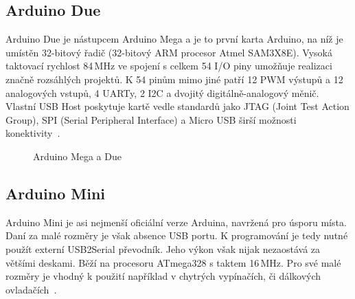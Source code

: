 		\subsection{Arduino Due} 
		Arduino Due je nástupcem Arduino Mega a je to první karta Arduino, na níž je umístěn 32-bitový řadič (32-bitový ARM procesor
		Atmel SAM3X8E). Vysoká taktovací rychlost 84\,MHz ve spojení s celkem 54 I/O piny umožňuje realizaci značně rozsáhlých projektů. K 54 pinům mimo jiné patří 12 PWM výstupů a 12 analogových vstupů, 4 UARTy, 2 I2C a dvojitý digitálně-analogový měnič. Vlastní USB Host poskytuje kartě vedle standardů jako JTAG (Joint Test Action Group), SPI (Serial Peripheral Interface) a Micro USB širší možnosti konektivity~\cite{ArduinoDue}.	

\begin{figure}[!ht]
    \centering
			\hspace*{5mm}
		\caption{Arduino Mega a Due}
\end{figure}


	\subsection{Arduino Mini} 
	Arduino Mini je asi nejmenší oficiální verze Arduina, navržená pro úsporu místa. Daní za malé rozměry je však absence USB portu. K programování je tedy nutné použít externí USB2Serial převodník. Jeho výkon však nijak nezaostává za většími deskami. Běží na procesoru ATmega328 s taktem 16\,MHz. Pro své malé rozměry je vhodný k použití například v chytrých vypínačích, či dálkových ovladačích~\cite{ArduinoMini}.	
	
